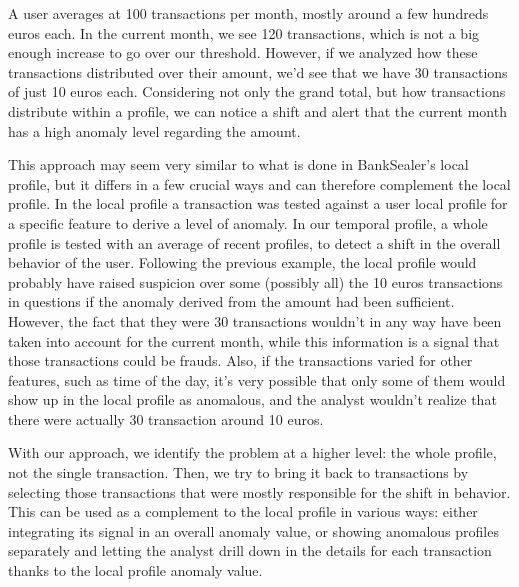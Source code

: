 A user averages at 100 transactions per month, mostly around a few hundreds euros each. In the current month, we see 120 transactions, which is not a big enough increase to go over our threshold. However, if we analyzed how these transactions distributed over their amount, we'd see that we have 30 transactions of just 10 euros each. Considering not only the grand total, but how transactions distribute within a profile, we can notice a shift and alert that the current month has a high anomaly level regarding the amount.

This approach may seem very similar to what is done in BankSealer's local profile, but it differs in a few crucial ways and can therefore complement the local profile. In the local profile a transaction was tested against a user local profile for a specific feature to derive a level of anomaly. In our temporal profile, a whole profile is tested with an average of recent profiles, to detect a shift in the overall behavior of the user. Following the previous example, the local profile would probably have raised suspicion over some (possibly all) the 10 euros transactions in questions if the anomaly derived from the amount had been sufficient. However, the fact that they were 30 transactions wouldn't in any way have been taken into account for the current month, while this information is a signal that those transactions could be frauds. Also, if the transactions varied for other features, such as time of the day, it's very possible that only some of them would show up in the local profile as anomalous, and the analyst wouldn't realize that there were actually 30 transaction around 10 euros.

With our approach, we identify the problem at a higher level: the whole profile, not the single transaction. Then, we try to bring it back to transactions by selecting those transactions that were mostly responsible for the shift in behavior. This can be used as a complement to the local profile in various ways: either integrating its signal in an overall anomaly value, or showing anomalous profiles separately and letting the analyst drill down in the details for each transaction thanks to the local profile anomaly value.
